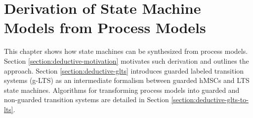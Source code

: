 \chapter{Derivation of State Machine Models from Process Models\label{chapter:deductive}}

This chapter shows how state machines can be synthesized from process models. Section \ref{section:deductive-motivation} motivates such derivation and outlines the approach. Section \ref{section:deductive-glts} introduces guarded labeled transition systems (g-LTS) as an intermediate formalism between guarded hMSCs and LTS state machines. Algorithms for transforming process models into guarded and non-guarded transition systems are detailed in Section \ref{section:deductive-glts-to-lts}.





